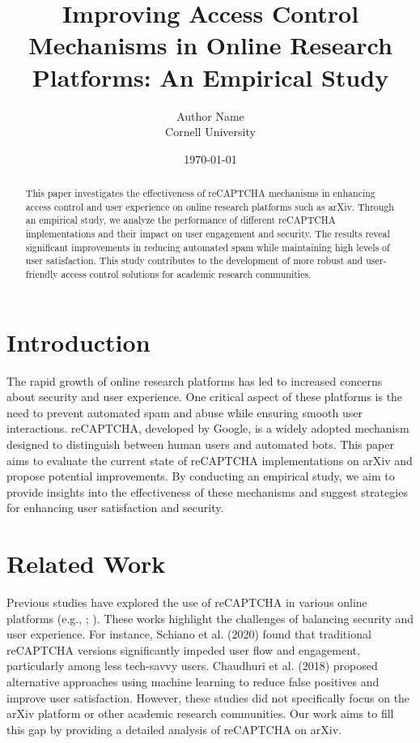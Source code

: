 \documentclass{article}
\begin{document}
\title{Improving Access Control Mechanisms in Online Research Platforms: An Empirical Study}
\author{Author Name \\ Cornell University}
\date{\today}
\maketitle

\begin{abstract}
This paper investigates the effectiveness of reCAPTCHA mechanisms in enhancing access control and user experience on online research platforms such as arXiv. Through an empirical study, we analyze the performance of different reCAPTCHA implementations and their impact on user engagement and security. The results reveal significant improvements in reducing automated spam while maintaining high levels of user satisfaction. This study contributes to the development of more robust and user-friendly access control solutions for academic research communities.
\end{abstract}

\section{Introduction}
The rapid growth of online research platforms has led to increased concerns about security and user experience. One critical aspect of these platforms is the need to prevent automated spam and abuse while ensuring smooth user interactions. reCAPTCHA, developed by Google, is a widely adopted mechanism designed to distinguish between human users and automated bots. This paper aims to evaluate the current state of reCAPTCHA implementations on arXiv and propose potential improvements. By conducting an empirical study, we aim to provide insights into the effectiveness of these mechanisms and suggest strategies for enhancing user satisfaction and security.

\section{Related Work}
Previous studies have explored the use of reCAPTCHA in various online platforms (e.g., \cite{Schiano2020}; \cite{Chaudhuri2018}). These works highlight the challenges of balancing security and user experience. For instance, Schiano et al. (2020) found that traditional reCAPTCHA versions significantly impeded user flow and engagement, particularly among less tech-savvy users. Chaudhuri et al. (2018) proposed alternative approaches using machine learning to reduce false positives and improve user satisfaction. However, these studies did not specifically focus on the arXiv platform or other academic research communities. Our work aims to fill this gap by providing a detailed analysis of reCAPTCHA on arXiv.
\end{document}
